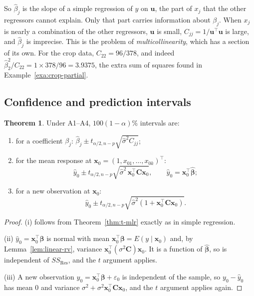 \documentclass[11pt,a4paper]{article}
\numberwithin{equation}{section}
\theoremstyle{definition}
\newtheorem{thm}{Theorem}[subsection]
\begin{document}
So $\hat\beta_j$ is the slope of a simple regression of $y$ on $\mathbf{u}$, the part of $x_j$
that the other regressors cannot explain. Only that part carries information about $\beta_j$.
When $x_j$ is nearly a combination of the other regressors, $\mathbf{u}$ is small,
$C_{jj} = 1/\mathbf{u}^\top\mathbf{u}$ is large, and $\hat\beta_j$ is imprecise. This is the
problem of \emph{multicollinearity}, which has a section of its own. For the crop data,
$C_{22} = 96/378$, and indeed $\hat\beta_2^2/C_{22} = 1 \times 378/96 = 3.9375$, the extra sum of
squares found in Example~\ref{exa:crop-partial}.

\subsection{Confidence and prediction intervals}
\begin{thm}\label{thm:mlr-intervals}
Under A1--A4, $100(1 - \alpha)\%$ intervals are:
\begin{enumerate}[label=(\roman*)]
\item for a coefficient $\beta_j$: $\hat\beta_j \pm t_{\alpha/2, n-p}\sqrt{\hat\sigma^2 C_{jj}}$;
\item for the mean response at $\mathbf{x}_0 = (1, x_{01}, \dots, x_{0k})^\top$:
\[
\hat y_0 \pm t_{\alpha/2, n-p}\sqrt{\hat\sigma^2\, \mathbf{x}_0^\top\mathbf{C}\mathbf{x}_0},
\qquad \hat y_0 = \mathbf{x}_0^\top\hat{\boldsymbol\beta} ;
\]
\item for a new observation at $\mathbf{x}_0$:
\[
\hat y_0 \pm t_{\alpha/2, n-p}\sqrt{\hat\sigma^2 \left(1 + \mathbf{x}_0^\top\mathbf{C}\mathbf{x}_0\right)} .
\]
\end{enumerate}
\end{thm}

\begin{proof}
(i) follows from Theorem~\ref{thm:t-mlr} exactly as in simple regression.

(ii) $\hat y_0 = \mathbf{x}_0^\top\hat{\boldsymbol\beta}$ is normal with mean
$\mathbf{x}_0^\top\boldsymbol\beta = E(y \mid \mathbf{x}_0)$ and, by Lemma~\ref{lem:linear-rv},
variance $\mathbf{x}_0^\top(\sigma^2\mathbf{C})\mathbf{x}_0$. It is a function of
$\hat{\boldsymbol\beta}$, so is independent of $SS_{\mathrm{Res}}$, and the $t$ argument applies.

(iii) A new observation $y_0 = \mathbf{x}_0^\top\boldsymbol\beta + \varepsilon_0$ is independent
of the sample, so $y_0 - \hat y_0$ has mean $0$ and variance
$\sigma^2 + \sigma^2\mathbf{x}_0^\top\mathbf{C}\mathbf{x}_0$, and the $t$ argument applies again.
\end{proof}
\end{document}
